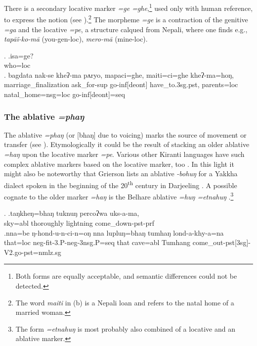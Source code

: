There is a secondary locative marker \emph{=ge \ti =ghe},\footnote{Both forms are equally acceptable, and semantic differences could not be detected.} used only with human reference, to express the notion  (see \Next).\footnote{The word \emph{maiti} in (b) is a Nepali loan and refers to the natal home of a married woman.} The morpheme \emph{=ge} is a contraction of the genitive \emph{=ga} and the locative \emph{=pe}, a structure calqued from Nepali, where one finds e.g.,  \emph{tapāĩ-ko-mā}  (you-{\sc gen-loc}), \emph{mero-mā}  (mine-{\sc loc}). 

\ex. \ag.isa=ge?\\
		who{\sc =loc}\\
 	\bg. bagdata                  nak-se            kheʔ-ma           pʌryo,  mapaci=ghe,                maiti=ci=ghe             kheʔ-ma=hoŋ,\\
		marriage\_finalization ask\_for{\sc -sup} go{\sc -inf[deont]} have\_to{\sc .3sg.pst},  parents{\sc =loc} natal\_home{\sc =nsg=loc} go{\sc -inf[deont]=seq} \\
	 
	
\subsubsection{The ablative  \emph{=phaŋ}}\label{case-abl}	

The ablative \emph{=phaŋ} (or [bhaŋ] due to voicing) marks the source of movement or transfer (see \Next). Etymologically it could be the result of stacking an older ablative \emph{=haŋ} upon the locative marker \emph{=pe}. Various other Kiranti languages have such complex ablative markers based on the locative marker, too \citep[81]{Ebert1994The-structure}. In this light it might also be noteworthy that Grierson lists an ablative \emph{-bohuŋ}  for a Yakkha dialect spoken in the beginning of the 20\textsuperscript{th} century  in Darjeeling \citep{Grierson1909Linguistic}. A possible cognate to the older marker \emph{=haŋ} is the  Belhare ablative \emph{=huŋ \ti =etnahuŋ} \citep[549]{Bickel2003Belhare}.\footnote{The form \emph{=etnahuŋ} is most probably also combined of a locative and an ablative marker.}

\ex. \ag.taŋkheŋ=bhaŋ   tuknuŋ    percoʔwa uks-a-ma,\\
sky{\sc =abl} thoroughly lightning come\_down{\sc [3sg]-pst-prf}\\
\bg.nna=be     ŋ-hond-u-n-ci-n=oŋ                            nna  lupluŋ=bhaŋ   tumhaŋ lond-a-khy-a=na\\
that{\sc =loc} {\sc neg-}fit{\sc -3.P-neg-3nsg.P=seq} that  cave{\sc =abl} Tumhang come\_out{\sc -pst[3sg]-V2.go-pst=nmlz.sg}\\


